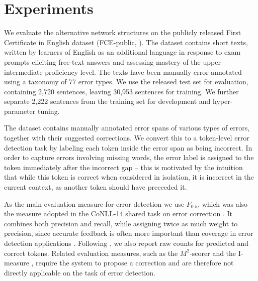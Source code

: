\documentclass[11pt]{article}
\begin{document}
\section{Experiments}
\label{sec:experiments}

We evaluate the alternative network structures on the publicly released First Certificate in English dataset  (FCE-public, ). The dataset contains short texts, written by learners of English as an additional language in response to exam prompts eliciting free-text answers and assessing mastery of the upper-intermediate proficiency level. 
The texts have been manually error-annotated using a taxonomy of 77 error types. We use the released test set for evaluation, containing 2,720 sentences, leaving 30,953 sentences for training.
We further separate 2,222 sentences from the training set for development and hyper-parameter tuning.

The dataset contains manually annotated error spans of various types of errors, together with their suggested corrections. We convert this to a token-level error detection task by labeling each token inside the error span as being incorrect. 
In order to capture errors involving missing words, the error label is assigned to the token immediately after the incorrect gap -- this is motivated by the intuition that while this token is correct when considered in isolation, it is incorrect in the current context, as another token should have preceeded it.

As the main evaluation measure for error detection we use $F_{0.5}$, which was also the measure adopted in the CoNLL-14 shared task on error correction \cite{Ng2013a}. It combines both precision and recall, while assigning twice as much weight to precision, since accurate feedback is often more important than coverage in error detection applications \cite{Nagata2010}.
Following , we also report raw counts for predicted and correct tokens.
Related evaluation measures, such as the $M^2$-scorer \cite{Ng2013a} and the I-measure \cite{Felice2015}, require the system to propose a correction and are therefore not directly applicable on the task of error detection.
\end{document}

